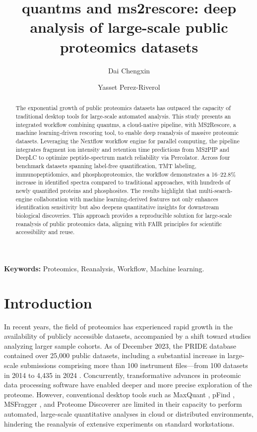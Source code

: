 \documentclass[12pt]{article}
\title{quantms and ms2rescore: deep analysis of large-scale public proteomics datasets}
\author[1]{Dai Chengxin}
\author[2]{Yasset Perez-Riverol}
\affil[1]{Department of Chemistry, University Name, City, Country}
\affil[2]{Department of Biology, Another University, City, Country}
\date{}
\begin{document}
\maketitle
\doublespacing  %

\begin{abstract}
The exponential growth of public proteomics datasets has outpaced the capacity of traditional desktop tools for large-scale automated analysis. This study presents an integrated workflow combining quantms, a cloud-native pipeline, with MS2Rescore, a machine learning-driven rescoring tool, to enable deep reanalysis of massive proteomic datasets. Leveraging the Nextflow workflow engine for parallel computing, the pipeline integrates fragment ion intensity and retention time predictions from MS2PIP and DeepLC to optimize peptide-spectrum match reliability via Percolator. Across four benchmark datasets spanning label-free quantification, TMT labeling, immunopeptidomics, and phosphoproteomics, the workflow demonstrates a 16–22.8\% increase in identified spectra compared to traditional approaches, with hundreds of newly quantified proteins and phosphosites. The results highlight that multi-search-engine collaboration with machine learning-derived features not only enhances identification sensitivity but also deepens quantitative insights for downstream biological discoveries. This approach provides a reproducible solution for large-scale reanalysis of public proteomics data, aligning with FAIR principles for scientific accessibility and reuse.

\end{abstract}

\noindent\textbf{Keywords:} Proteomics, Reanalysis, Workflow, Machine learning.

\section{Introduction}
In recent years, the field of proteomics has experienced rapid growth in the availability of publicly accessible datasets, accompanied by a shift toward studies analyzing larger sample cohorts. As of December 2023, the PRIDE database contained over 25,000 public datasets, including a substantial increase in large-scale submissions comprising more than 100 instrument files—from 100 datasets in 2014 to 4,435 in 2024 \cite{perez-riverol_pride_2025}. Concurrently, transformative advances in proteomic data processing software have enabled deeper and more precise exploration of the proteome. However, conventional desktop tools such as MaxQuant \cite{cox_maxquant_2008}, pFind \cite{wang_pfind_2007}, MSFragger \cite{kong_msfragger_2017}, and Proteome Discoverer are limited in their capacity to perform automated, large-scale quantitative analyses in cloud or distributed environments, hindering the reanalysis of extensive experiments on standard workstations.
\end{document}

